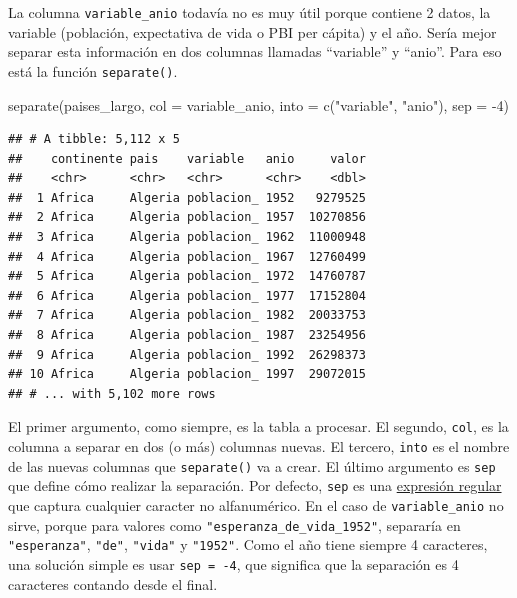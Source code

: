 \documentclass[
  openany]{book}
\newenvironment{Shaded}{\begin{snugshade}}{\end{snugshade}}
\newcommand{\AttributeTok}[1]{\textcolor[rgb]{0.77,0.63,0.00}{#1}}
\newcommand{\DecValTok}[1]{\textcolor[rgb]{0.00,0.00,0.81}{#1}}
\newcommand{\FunctionTok}[1]{\textcolor[rgb]{0.00,0.00,0.00}{#1}}
\newcommand{\NormalTok}[1]{#1}
\newcommand{\SpecialCharTok}[1]{\textcolor[rgb]{0.00,0.00,0.00}{#1}}
\newcommand{\StringTok}[1]{\textcolor[rgb]{0.31,0.60,0.02}{#1}}
\begin{document}
La columna \texttt{variable\_anio} todavía no es muy útil porque contiene 2 datos, la variable (población, expectativa de vida o PBI per cápita) y el año.
Sería mejor separar esta información en dos columnas llamadas ``variable'' y ``anio''.
Para eso está la función \texttt{separate()}.

\begin{Shaded}
\begin{Highlighting}[]
\FunctionTok{separate}\NormalTok{(paises\_largo, }
         \AttributeTok{col =}\NormalTok{ variable\_anio, }
         \AttributeTok{into =} \FunctionTok{c}\NormalTok{(}\StringTok{"variable"}\NormalTok{, }\StringTok{"anio"}\NormalTok{), }
         \AttributeTok{sep =} \SpecialCharTok{{-}}\DecValTok{4}\NormalTok{)}
\end{Highlighting}
\end{Shaded}

\begin{verbatim}
## # A tibble: 5,112 x 5
##    continente pais    variable   anio     valor
##    <chr>      <chr>   <chr>      <chr>    <dbl>
##  1 Africa     Algeria poblacion_ 1952   9279525
##  2 Africa     Algeria poblacion_ 1957  10270856
##  3 Africa     Algeria poblacion_ 1962  11000948
##  4 Africa     Algeria poblacion_ 1967  12760499
##  5 Africa     Algeria poblacion_ 1972  14760787
##  6 Africa     Algeria poblacion_ 1977  17152804
##  7 Africa     Algeria poblacion_ 1982  20033753
##  8 Africa     Algeria poblacion_ 1987  23254956
##  9 Africa     Algeria poblacion_ 1992  26298373
## 10 Africa     Algeria poblacion_ 1997  29072015
## # ... with 5,102 more rows
\end{verbatim}

El primer argumento, como siempre, es la tabla a procesar.
El segundo, \texttt{col}, es la columna a separar en dos (o más) columnas nuevas.
El tercero, \texttt{into} es el nombre de las nuevas columnas que \texttt{separate()} va a crear.
El último argumento es \texttt{sep} que define cómo realizar la separación.
Por defecto, \texttt{sep} es una \href{https://es.wikipedia.org/wiki/Expresi\%C3\%B3n_regular}{expresión regular} que captura cualquier caracter no alfanumérico.
En el caso de \texttt{variable\_anio} no sirve, porque para valores como \texttt{"esperanza\_de\_vida\_1952"}, separaría en \texttt{"esperanza"}, \texttt{"de"}, \texttt{"vida"} y \texttt{"1952"}.
Como el año tiene siempre 4 caracteres, una solución simple es usar \texttt{sep\ =\ -4}, que significa que la separación es 4 caracteres contando desde el final.
\end{document}
